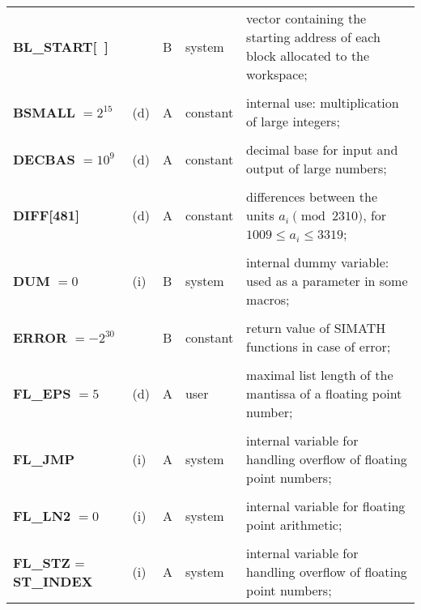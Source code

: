 {{\begin{tabular}{p{1.65in}p{0.2in}|p{0.15in}|p{0.54in}|p{2.60in}}
{\bf BL\_START[\ ]}        &     & B    & system        & vector containing the starting address of each block allocated
                                                          to the workspace;\\
                           &     &       &              & \\ 
{\bf BSMALL} $=2^{15}$     & (d) & A    & constant      & internal use: multiplication of large in\-te\-gers; \\
                           &     &      &               & \\  
{\bf DECBAS} $=10^9$       & (d) & A    & constant      & decimal base for input and output of large numbers;\\
                           &     &      &               & \\
{\bf DIFF[481]}            & (d) & A    & constant      & differences between the units \newline  $a_i \pmod{2310}$, for $1009 \leq
                                                          a_i \leq 3319$;\\
                           &     &      &               & \\
{\bf DUM} $=0$             & (i) & B    & system        & internal dummy 
						variable: used as a par\-ameter 
						in some macros;\\
                           &     &      &               & \\
{\bf ERROR} $=-2^{30}$     &     & B    & constant      & return value of SIMATH functions in case of error;\\
                           &     &      &               & \\
{\bf FL\_EPS} $=5$         & (d) & A    & user          & maximal list length of the mantissa of a floating point number;\\
                           &     &      &               & \\
{\bf FL\_JMP}              & (i) & A    & system        & internal variable for handling overflow of floating point numbers;\\  
                           &     &      &               & \\
{\bf FL\_LN2} $=0$    & (i) & A         & system        & internal variable for floating point arith\-me\-tic;\\
                           &     &      &               & \\
{\bf FL\_STZ} = {\bf ST\_INDEX}
                           & (i) & A    & system        & internal variable for handling overflow of floating point numbers;\\

\end{tabular}}}
